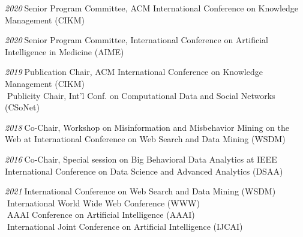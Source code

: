 \documentclass[10pt]{article}
\newenvironment{myindentpar}[1]%
{\begin{list}{}%
         {\setlength{\leftmargin}{#1}}%
         \item[]%
}
{\end{list}}
\newcounter{list}
\begin{document}
\begin{myindentpar}{0.75cm}

\hspace{-0.75cm}{\bf Organizing Committee}

{\small

\hspace{-0.75cm}\textit{2020}\textcolor{white}{.}Senior Program Committee, ACM International Conference on Knowledge Management (CIKM)

\hspace{-0.75cm}\textit{2020}\textcolor{white}{.}Senior Program Committee, International Conference on Artificial Intelligence in Medicine (AIME)

\hspace{-0.75cm}\textit{2019}\textcolor{white}{.}Publication Chair, ACM International Conference on Knowledge Management (CIKM) \\
\textcolor{white}{.}Publicity Chair, Int'l Conf. on Computational Data and Social Networks (CSoNet)

\hspace{-0.75cm}\textit{2018}\textcolor{white}{.}Co-Chair, Workshop on Misinformation and Misbehavior Mining on the Web at International Conference on Web Search and Data Mining (WSDM)

\hspace{-0.75cm}\textit{2016}\textcolor{white}{.}Co-Chair, Special session on Big Behavioral Data Analytics at IEEE International Conference on Data Science and Advanced Analytics (DSAA)

}


\hspace{-0.75cm}{\bf Program Committee}

{\small

\hspace{-0.75cm}\textit{2021}\textcolor{white}{.}International Conference on Web Search and Data Mining (WSDM) \\
\textcolor{white}{.}International World Wide Web Conference (WWW) \\
\textcolor{white}{.}AAAI Conference on Artificial Intelligence (AAAI) \\
\textcolor{white}{.}International Joint Conference on Artificial Intelligence (IJCAI)

}
\end{myindentpar}
\end{document}
